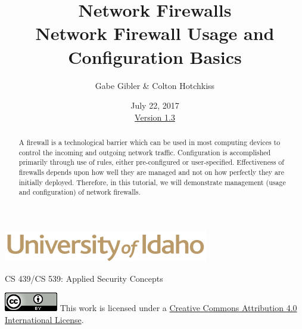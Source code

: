\documentclass[12pt]{extarticle}
\begin{document}
\title{ Network Firewalls\\ \normalsize Network Firewall Usage and Configuration Basics }
\author{ Gabe Gibler \& Colton Hotchkiss }
\date{ July 22, 2017 \\ \hyperref[changelog]{Version 1.3} }
\renewcommand{\abstractname}{Summary}
\begin{titlepage}
\maketitle
{}
\begin{center}
\includegraphics[scale=.5]{UofI}

\large{CS 439/CS 539: Applied Security Concepts}

\vskip 40pt

\end{center}
\begin{abstract}
A firewall is a technological barrier which can be used in most computing devices to control the incoming and outgoing network traffic. Configuration is accomplished primarily through use of rules, either pre-configured or user-specified. Effectiveness of firewalls depends upon how well they are managed and not on how perfectly they are initially deployed. Therefore, in this tutorial, we will demonstrate management (usage and configuration) of network firewalls.
\end{abstract}


\vfill
\begin{center}
	\includegraphics[scale=0.5]{cc}
	\vskip 10pt
	This work is licensed under a \href{https://creativecommons.org/licenses/by/4.0/}{Creative Commons Attribution 4.0 International License}.
\end{center}

\end{titlepage}


\pagebreak
\tableofcontents

\end{document}
